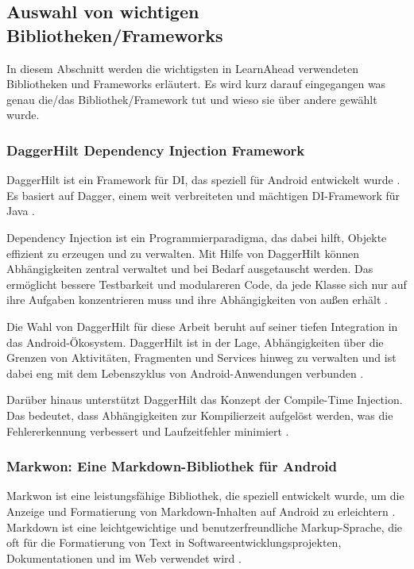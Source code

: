 \subsection{Auswahl von wichtigen Bibliotheken/Frameworks} \label{Auswahl BibliothekenFrameworks}
In diesem Abschnitt werden die wichtigsten in LearnAhead verwendeten Bibliotheken und Frameworks erläutert. Es wird kurz darauf eingegangen was genau die/das Bibliothek/Framework tut und wieso sie über andere gewählt wurde.

\subsubsection{DaggerHilt Dependency Injection Framework}
DaggerHilt ist ein Framework für \ac*{DI}, das speziell für Android entwickelt wurde \cite{Dagger2021}. Es basiert auf Dagger, einem weit verbreiteten und mächtigen DI-Framework für Java \cite{AndroidDevelopers2021}. \newline

\noindent
Dependency Injection ist ein Programmierparadigma, das dabei hilft, Objekte effizient zu erzeugen und zu verwalten. Mit Hilfe von DaggerHilt können Abhängigkeiten zentral verwaltet und bei Bedarf ausgetauscht werden. Das ermöglicht bessere Testbarkeit und modulareren Code, da jede Klasse sich nur auf ihre Aufgaben konzentrieren muss und ihre Abhängigkeiten von außen erhält \cite{Dagger2021}. \newline

\noindent
Die Wahl von DaggerHilt für diese Arbeit beruht auf seiner tiefen Integration in das Android-Ökosystem. DaggerHilt ist in der Lage, Abhängigkeiten über die Grenzen von Aktivitäten, Fragmenten und Services hinweg zu verwalten und ist dabei eng mit dem Lebenszyklus von Android-Anwendungen verbunden \cite{AndroidDevelopers2021}. \newline

\noindent
Darüber hinaus unterstützt DaggerHilt das Konzept der Compile-Time Injection. Das bedeutet, dass Abhängigkeiten zur Kompilierzeit aufgelöst werden, was die Fehlererkennung verbessert und Laufzeitfehler minimiert \cite{Dagger2021}.

\subsubsection{Markwon: Eine Markdown-Bibliothek für Android}
Markwon ist eine leistungsfähige Bibliothek, die speziell entwickelt wurde, um die Anzeige und Formatierung von Markdown-Inhalten auf Android zu erleichtern \cite{Markwon2022}. Markdown ist eine leichtgewichtige und benutzerfreundliche Markup-Sprache, die oft für die Formatierung von Text in Softwareentwicklungsprojekten, Dokumentationen und im Web verwendet wird \cite{Gruber2004}. \newline

